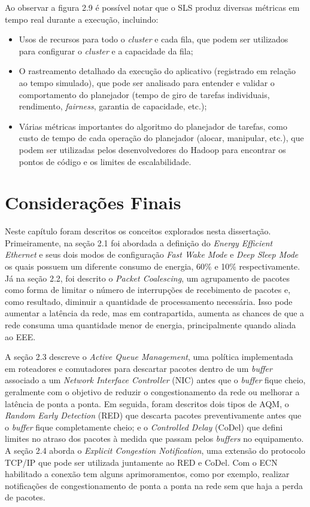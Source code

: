 Ao observar a figura 2.9 é possível notar que o SLS produz diversas métricas em tempo real durante a execução, incluindo:

\begin{itemize}
    \item Usos de recursos para todo o \emph{cluster} e cada fila, que podem ser utilizados para configurar o \emph{cluster} e a capacidade da fila;
    \item O rastreamento detalhado da execução do aplicativo (registrado em relação ao tempo simulado), que pode ser analisado para entender e validar o comportamento do planejador (tempo de giro de tarefas individuais, rendimento, \emph{fairness}, garantia de capacidade, etc.);
    \item Várias métricas importantes do algoritmo do planejador de tarefas, como custo de tempo de cada operação do planejador (alocar, manipular, etc.), que podem ser utilizadas pelos desenvolvedores do Hadoop para encontrar os pontos de código e os limites de escalabilidade.
\end{itemize}

\section{Considerações Finais}

Neste capítulo foram descritos os conceitos explorados nesta dissertação. Primeiramente,
na seção 2.1 foi abordada a definição do \emph{Energy Efficient Ethernet} e seus dois modos de configuração \emph{Fast Wake Mode} e \emph{Deep Sleep Mode} os quais possuem um diferente consumo de energia, 60\% e 10\% respectivamente. Já na seção 2.2, foi descrito o \emph{Packet Coalescing}, um agrupamento de pacotes como forma de limitar o número de interrupções de recebimento de pacotes e, como resultado, diminuir a quantidade de processamento necessária. Isso pode aumentar a latência da rede, mas em contrapartida, aumenta as chances de que a rede consuma uma quantidade menor de energia, principalmente quando aliada ao EEE.

A seção 2.3 descreve o \emph{Active Queue Management}, uma política implementada em roteadores e comutadores para descartar pacotes dentro de um \emph{buffer} associado a um \emph{Network Interface Controller} (NIC) antes que o \emph{buffer} fique cheio, geralmente com o objetivo de reduzir o congestionamento da rede ou melhorar a latência de ponta a ponta.  Em seguida, foram descritos dois tipos de AQM, o \emph{Random Early Detection} (RED) que descarta pacotes preventivamente antes que o \emph{buffer} fique completamente cheio; e o \emph{Controlled Delay} (CoDel) que defini limites no atraso dos pacotes à medida que passam pelos \emph{buffers} no equipamento. A seção 2.4 aborda o \emph{Explicit Congestion Notification}, uma extensão do protocolo TCP/IP que pode ser utilizada juntamente ao RED e CoDel. Com o ECN habilitado a conexão tem alguns aprimoramentos, como por exemplo, realizar notificações de congestionamento de ponta a ponta na rede sem que haja a perda de pacotes.

